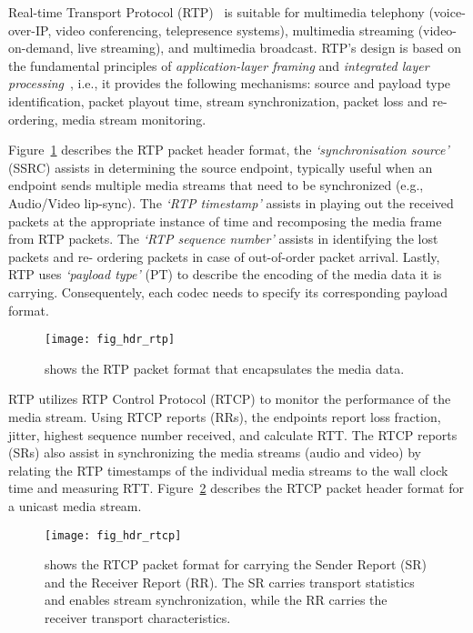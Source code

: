 
Real-time Transport Protocol (RTP)~\cite{rfc3550} is suitable for multimedia
telephony (voice-over-IP, video conferencing, telepresence systems),
multimedia streaming (video-on-demand, live streaming), and multimedia
broadcast. RTP's design is based on the fundamental principles of \textit
{application-layer framing} and \textit{integrated layer
processing}~\cite{clark:alf}, i.e., it provides the following mechanisms:
source and payload type identification, packet playout time, stream
synchronization, packet loss and re-ordering, media stream monitoring.

Figure~\ref{fig:3:rtp.hdr} describes the RTP packet header format, the
\textit{`synchronisation source'} (SSRC) assists in determining the source
endpoint, typically useful when an endpoint sends multiple media streams that
need to be synchronized (e.g., Audio/Video lip-sync). The \textit{`RTP
timestamp'} assists in playing out the received packets at the appropriate
instance of time and recomposing the media frame from RTP packets. The
\textit{`RTP sequence number'} assists in identifying the lost packets and re-
ordering packets in case of out-of-order packet arrival. Lastly, RTP uses
\textit{`payload type'} (PT) to describe the encoding of the media data it is
carrying. Consequentely, each codec needs to specify its corresponding payload
format.

\begin{figure}[!htbp]
\centerline{\texttt{[image: fig\_hdr\_rtp]}}
\caption{shows the RTP packet format that encapsulates the media data.}
\label{fig:3:rtp.hdr}
\end{figure}

RTP utilizes RTP Control Protocol (RTCP) to monitor the performance of the
media stream. Using RTCP reports (RRs), the endpoints report loss fraction,
jitter, highest sequence number received, and calculate RTT. The RTCP reports
(SRs) also assist in synchronizing the media streams (audio and video) by
relating the RTP timestamps of the individual media streams to the wall clock
time and measuring RTT. Figure~\ref{fig:3:rtcp.hdr} describes the RTCP packet
header format for a unicast media stream.

\begin{figure}
\centerline{\texttt{[image: fig\_hdr\_rtcp]}}
\caption{shows the RTCP packet format for carrying the Sender Report (SR) and
the Receiver Report (RR). The SR carries transport statistics and enables 
stream synchronization, while the RR carries the receiver transport 
characteristics.}
\label{fig:3:rtcp.hdr}
\end{figure}

